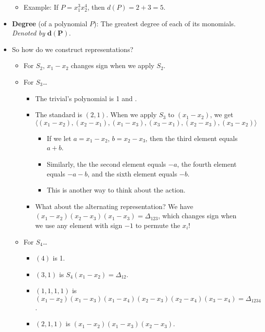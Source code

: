 \documentclass[../notes.tex]{subfiles}
\begin{document}
\begin{itemize}
\begin{itemize}
        \item Example: If $P=x_1^3x_2^4$, then $d(P)=2+3=5$.
    \end{itemize}
    \item \textbf{Degree} (of a polynomial $P$): The greatest degree of each of its monomials. \emph{Denoted by} $\bm{d(P)}$.
    \item So how do we construct representations?
    \begin{itemize}
        \item For $S_2$, $x_1-x_2$ changes sign when we apply $S_2$.
        \item For $S_3$\dots
        \begin{itemize}
            \item The trivial's polynomial is 1 and .
            \item The standard is $(2,1)$. When we apply $S_3$ to $(x_1-x_2)$, we get
            \begin{equation*}
                \langle (x_1-x_2),(x_2-x_1),(x_1-x_3),(x_3-x_1),(x_2-x_3),(x_3-x_2) \rangle
            \end{equation*}
            \begin{itemize}
                \item If we let $a=x_1-x_2$, $b=x_2-x_3$, then the third element equals $a+b$.
                \item Similarly, the the second element equals $-a$, the fourth element equals $-a-b$, and the sixth element equals $-b$.
                \item This is another way to think about the action.
            \end{itemize}
            \item What about the alternating representation? We have $(x_1-x_2)(x_2-x_3)(x_1-x_3)=\Delta_{123}$, which changes sign when we use any element with sign $-1$ to permute the $x_i$!
        \end{itemize}
        \item For $S_4$\dots
        \begin{itemize}
            \item $(4)$ is 1.
            \item $(3,1)$ is $S_4(x_1-x_2)=\Delta_{12}$.
            \item $(1,1,1,1)$ is $(x_1-x_2)(x_1-x_3)(x_1-x_4)(x_2-x_3)(x_2-x_4)(x_3-x_4)=\Delta_{1234}$.
            \item $(2,1,1)$ is $(x_1-x_2)(x_1-x_3)(x_2-x_3)$.
            \begin{itemize}

\end{itemize}
\end{itemize}
\end{itemize}
\end{itemize}
\end{document}
